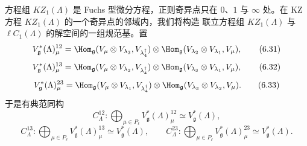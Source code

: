 方程组 $KZ_1(\Lambda)$ 是 Fuchs 型微分方程，正则奇异点只在 $0$、$1$ 与
$\infty$ 处。在 KZ 方程 $KZ_1(\Lambda)$ 的一个奇异点的邻域内，我们将构造
联立方程组 $KZ_1(\Lambda)$ 与 $\ell C_1(\Lambda)$ 的解空间的一组规范基。置
\begin{equation}
V^{*}_{\mathfrak{g}}(\Lambda)^{12}_{\mu}
=\Hom_{\mathfrak{g}}(V_\mu\otimes V_{\lambda_3},V_{\lambda_4^{\dagger}})
\otimes\Hom_{\mathfrak{g}}(V_{\lambda_2}\otimes V_{\lambda_1},V_\mu),
\tag{6.31}
\end{equation}
\begin{equation}
V^{*}_{\mathfrak{g}}(\Lambda)^{13}_{\mu}
=\Hom_{\mathfrak{g}}(V_\mu\otimes V_{\lambda_2},V_{\lambda_4^{\dagger}})
\otimes\Hom_{\mathfrak{g}}(V_{\lambda_3}\otimes V_{\lambda_1},V_\mu),
\tag{6.32}
\end{equation}
\begin{equation}
V^{*}_{\mathfrak{g}}(\Lambda)^{23}_{\mu}
=\Hom_{\mathfrak{g}}(V_\mu\otimes V_{\lambda_1},V_{\lambda_4^{\dagger}})
\otimes\Hom_{\mathfrak{g}}(V_{\lambda_3}\otimes V_{\lambda_2},V_\mu).
\tag{6.33}
\end{equation}
于是有典范同构
\[
C^{12}_{\Lambda}:\bigoplus_{\mu\in P_\ell}
V^{*}_{\mathfrak{g}}(\Lambda)^{12}_{\mu}\simeq
V^{*}_{\mathfrak{g}}(\Lambda),
\]
\[
C^{13}_{\Lambda}:\bigoplus_{\mu\in P_\ell}
V^{*}_{\mathfrak{g}}(\Lambda)^{13}_{\mu}\simeq
V^{*}_{\mathfrak{g}}(\Lambda),\qquad
C^{23}_{\Lambda}:\bigoplus_{\mu\in P_\ell}
V^{*}_{\mathfrak{g}}(\Lambda)^{23}_{\mu}\simeq
V^{*}_{\mathfrak{g}}(\Lambda).
\]


